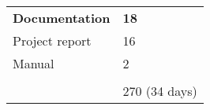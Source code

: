 \documentclass[a4paper]{article}
\begin{document}
\begin{table}[H]
\begin{tabular}{ll}
    \textbf{Documentation}                                                                                                                              & \textbf{18}     \\
    Project report                                                                                                                                      & 16              \\
    Manual                                                                                                                                              & 2               \\
                                                                                                                                                        &                 \\
                                                                                                                                                        & 270 (34 days)
    \end{tabular}
\end{table}


 
\end{document}
